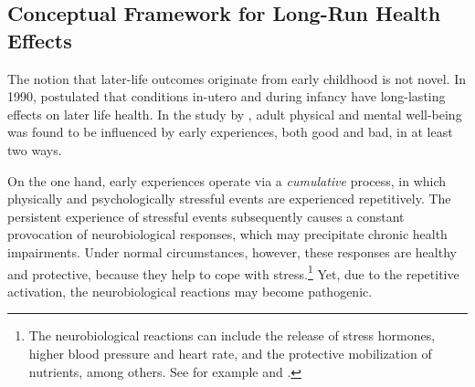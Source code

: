 









\subsection{Conceptual Framework for Long-Run Health Effects} \label{rev_mlch: restructure_discussion_framework}
 The notion that later-life outcomes originate from early childhood is not novel. In 1990, \citeauthor{Barker1990origins} postulated that conditions in-utero and during infancy have long-lasting effects on later life health. In the study by \cite{shonkoff2009neuroscience}, adult physical and mental well-being was found to be influenced by early experiences, both good and bad, in at least two ways.

On the one hand, early experiences operate via a \emph{cumulative} process, in which physically and psychologically stressful events are experienced repetitively. The persistent experience of stressful events subsequently causes a constant provocation of neurobiological responses, which may precipitate chronic health impairments. Under normal circumstances, however, these responses are healthy and protective, because they help to cope with stress.\footnote{The neurobiological reactions can include the release of stress hormones, higher blood pressure and heart rate, and the protective mobilization of nutrients, among others. See for example \cite{mcewen1998stress} and \cite{shonkoff2009neuroscience}.} Yet, due to the repetitive activation, the neurobiological reactions may become pathogenic.


